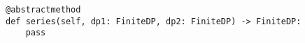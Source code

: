 \par\begin{minipage}{60ex}
\begin{verbatim}
@abstractmethod
def series(self, dp1: FiniteDP, dp2: FiniteDP) -> FiniteDP:
    pass
\end{verbatim}
\end{minipage}\par